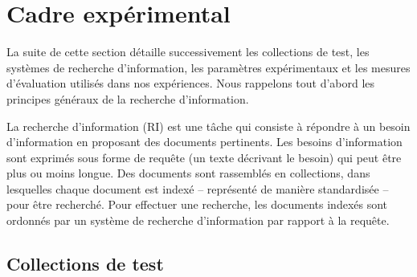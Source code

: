 

\section{Cadre expérimental}
\label{sec:ri_framework}

La suite de cette section détaille successivement les collections de test, les systèmes de recherche d'information, les paramètres expérimentaux et les mesures d'évaluation utilisés dans nos expériences.
Nous rappelons tout d'abord les principes généraux de la recherche d'information.

La recherche d'information (RI) est une tâche qui consiste à répondre à un besoin d'information en proposant des documents pertinents.
Les besoins d'information sont exprimés sous forme de requête (un texte décrivant le besoin) qui peut être plus ou moins longue.
Des documents sont rassemblés en collections, dans lesquelles chaque document est indexé -- représenté de manière standardisée -- pour être recherché.
Pour effectuer une recherche, les documents indexés sont ordonnés par un système de recherche d'information par rapport à la requête.






\subsection{Collections de test}


